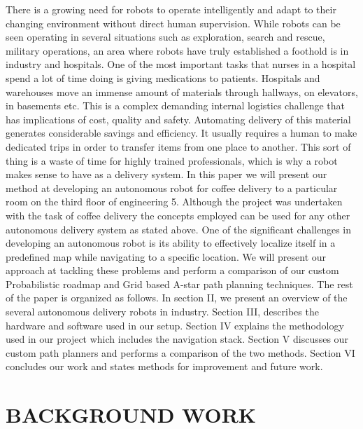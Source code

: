 \documentclass[letterpaper, 10 pt, conference]{ieeeconf}  %
\begin{document}
There is a growing need for robots to operate intelligently and adapt to their changing environment without direct human supervision. While robots can be seen operating in several situations such as exploration, search and rescue, military operations, an area where robots have truly established a foothold is in industry and hospitals.
One of the most important tasks that nurses in a hospital spend a lot of time doing is giving medications to patients. Hospitals and warehouses move an immense amount of materials through hallways, on elevators, in basements etc. This is a complex demanding internal logistics challenge that has implications of cost, quality and safety. Automating delivery of this material generates considerable savings and efficiency. It usually requires a human to make dedicated trips in order to transfer items from one place to another. This sort of thing is a waste of time for highly trained professionals, which is why a robot makes sense to have as a delivery system. 
In this paper we will present our method at developing an autonomous robot for coffee delivery to a particular room on the third floor of engineering 5. Although the project was undertaken with the task of coffee delivery the concepts employed can be used for any other autonomous delivery system as stated above. One of the significant challenges in developing an autonomous robot is its ability to effectively localize itself in a predefined map while navigating to a specific location. We will present our approach at tackling these problems and perform a comparison of our custom Probabilistic roadmap and Grid based A-star path planning techniques.
The rest of the paper is organized as follows. In section II, we present an overview of the several autonomous delivery robots in industry. Section III, describes the hardware and software used in our setup. Section IV explains the methodology used in our project which includes the navigation stack. Section V discusses our custom path planners and performs a comparison of the two methods. Section VI concludes our work and states methods for improvement and future work.

\section{BACKGROUND WORK}
\end{document}
